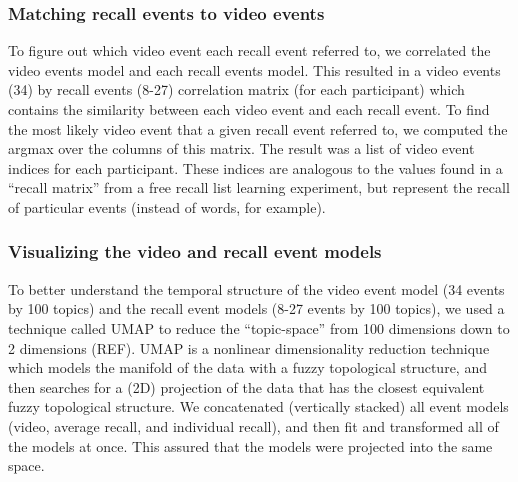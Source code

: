 \documentclass{article}
\begin{document}
{\subsubsection{Matching recall events to video events}
To figure out which video event each recall event referred to, we correlated the video events model and each recall events model. This resulted in a video events (34) by recall events (8-27) correlation matrix (for each participant) which contains the similarity between each video event and each recall event.  To find the most likely video event that a given recall event referred to, we computed the argmax over the columns of this matrix.  The result was a list of video event indices for each participant. These indices are analogous to the values found in a ``recall matrix'' from a free recall list learning experiment, but represent the recall of particular events (instead of words, for example).

\subsubsection{Visualizing the video and recall event models}
To better understand the temporal structure of the video event model (34 events by 100 topics) and the recall event models (8-27 events by 100 topics), we used a technique called UMAP to reduce the ``topic-space'' from 100 dimensions down to 2 dimensions (REF). UMAP is a nonlinear dimensionality reduction technique which models the manifold of the data with a fuzzy topological structure, and then searches for a (2D) projection of the data that has the closest equivalent fuzzy topological structure. We concatenated (vertically stacked) all event models (video, average recall, and individual recall), and then fit and transformed all of the models at once. This assured that the models were projected into the same space.

}
\end{document}
